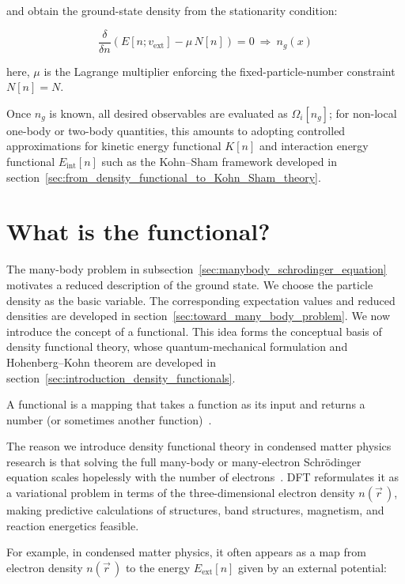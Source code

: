 and obtain the ground-state density from the stationarity condition:

\begin{equation}
    \frac{\delta}{\delta n}\left(E[n;v_\mathrm{ext}] - \mu\,N[n]\right)=0 \ \Rightarrow\ n_g(x)
\label{ground_state_density}
\end{equation}

here, $\mu$ is the Lagrange multiplier enforcing the fixed-particle-number constraint $N[n]=N$.

Once $n_g$ is known, all desired observables are evaluated as $\Omega_i[n_g]$; 
for non-local one-body or two-body quantities,
this amounts to adopting controlled approximations for kinetic energy functional $K[n]$ and interaction energy functional $E_\mathrm{int}[n]$ such as the Kohn--Sham framework developed in section~\ref{sec:from_density_functional_to_Kohn_Sham_theory}.

\newpage
\FloatBarrier
\section{What is the functional?}
\label{sec:appendix_functionals}

The many-body problem in subsection~\ref{sec:manybody_schrodinger_equation} motivates a reduced description of the ground state.
We choose the particle density as the basic variable.
The corresponding expectation values and reduced densities are developed in section~\ref{sec:toward_many_body_problem}.
We now introduce the concept of a functional.
This idea forms the conceptual basis of density functional theory,
whose quantum-mechanical formulation and Hohenberg--Kohn theorem are developed in section~\ref{sec:introduction_density_functionals}.

A functional is a mapping that takes a function as its input and returns a number (or sometimes another function)~\cite{parr1989density}.

The reason we introduce density functional theory in condensed matter physics research is that solving the full many-body or many-electron Schrödinger equation scales hopelessly with the number of electrons~\cite{becke2014perspective}.
DFT reformulates it as a variational problem in terms of the three-dimensional electron density
$n(\vec{r}\,)$, making predictive calculations of structures, band structures, magnetism, and reaction energetics feasible.

For example, in condensed matter physics, it often appears as a map from electron density $n(\vec{r}\,)$ to the energy $E_\mathrm{ext}[n]$ given by an external potential:


